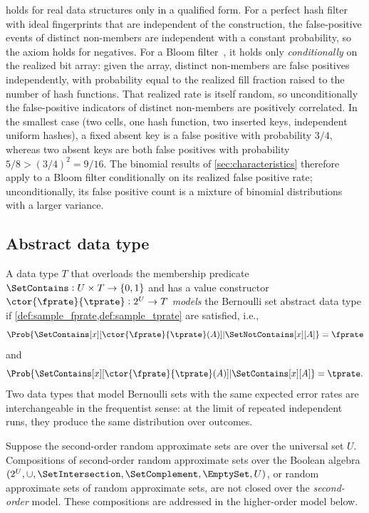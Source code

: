 \begin{remark}
\label{rem:implementations}
 holds for real data structures only in a qualified form.
For a perfect hash filter~\cite{phf} with ideal fingerprints that are independent of the construction, the false-positive events of distinct non-members are independent with a constant probability, so the axiom holds for negatives.
For a Bloom filter~\cite{bf}, it holds only \emph{conditionally} on the realized bit array: given the array, distinct non-members are false positives independently, with probability equal to the realized fill fraction raised to the number of hash functions.
That realized rate is itself random, so unconditionally the false-positive indicators of distinct non-members are positively correlated.
In the smallest case (two cells, one hash function, two inserted keys, independent uniform hashes), a fixed absent key is a false positive with probability $3/4$, whereas two absent keys are both false positives with probability $5/8 > (3/4)^2 = 9/16$.
The binomial results of \cref{sec:characteristics} therefore apply to a Bloom filter conditionally on its realized false positive rate; unconditionally, its false positive count is a mixture of binomial distributions with a larger variance.
\end{remark}

\subsection{Abstract data type}
\label{sec:adt}
A data type $T$ that overloads the membership predicate $\SetContains : U \times T \to \{0,1\}$ and has a value constructor $\ctor{\fprate}{\tprate} : 2^U \to T$ \emph{models} the Bernoulli set abstract data type if \cref{def:sample_fprate,def:sample_tprate} are satisfied, i.e.,
\begin{equation}
	\Prob{\SetContains[x][\ctor{\fprate}{\tprate}(A)] | \SetNotContains[x][A]} = \fprate
\end{equation}
and
\begin{equation}
	\Prob{\SetContains[x][\ctor{\fprate}{\tprate}(A)] | \SetContains[x][A]} = \tprate.
\end{equation}
Two data types that model Bernoulli sets with the same expected error rates are interchangeable in the frequentist sense: at the limit of repeated independent runs, they produce the same distribution over outcomes.

Suppose the second-order random approximate sets are over the universal set $U$.
Compositions of second-order random approximate sets over the Boolean algebra $(2^U,\cup,\SetIntersection,\SetComplement,\EmptySet,U)$, or random approximate sets of random approximate sets, are not closed over the \emph{second-order} model.
These compositions are addressed in the higher-order model below.

